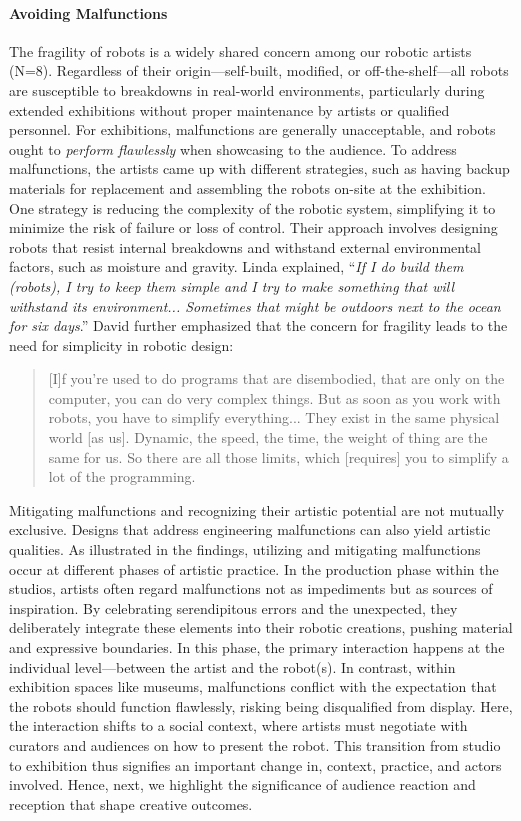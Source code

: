 \paragraph{Avoiding Malfunctions}
The fragility of robots is a widely shared concern among our robotic artists (N=8). Regardless of their origin---self-built, modified, or off-the-shelf---all robots are susceptible to breakdowns in real-world environments, particularly during extended exhibitions without proper maintenance by artists or qualified personnel. For exhibitions, malfunctions are generally unacceptable, and robots ought to \textit{perform flawlessly} when showcasing to the audience. To address malfunctions, the artists came up with different strategies, such as having backup materials for replacement and assembling the robots on-site at the exhibition. One strategy is reducing the complexity of the robotic system, simplifying it to minimize the risk of failure or loss of control. Their approach involves designing robots that resist internal breakdowns and withstand external environmental factors, such as moisture and gravity. Linda explained, ``\textit{If I do build them (robots), I try to keep them simple and I try to make something that will withstand its environment... Sometimes that might be outdoors next to the ocean for six days}.'' David further emphasized that the concern for fragility leads to the need for simplicity in robotic design:

\begin{quote}
    [I]f you're used to do programs that are disembodied, that are only on the computer, you can do very complex things. But as soon as you work with robots, you have to simplify everything... They exist in the same physical world [as us]. Dynamic, the speed, the time, the weight of thing are the same for us. So there are all those limits, which [requires] you to simplify a lot of the programming.
\end{quote}

Mitigating malfunctions and recognizing their artistic potential are not mutually exclusive. Designs that address engineering malfunctions can also yield artistic qualities. As illustrated in the findings, utilizing and mitigating malfunctions occur at different phases of artistic practice. In the production phase within the studios, artists often regard malfunctions not as impediments but as sources of inspiration. By celebrating serendipitous errors and the unexpected, they deliberately integrate these elements into their robotic creations, pushing material and expressive boundaries. In this phase, the primary interaction happens at the individual level---between the artist and the robot(s). In contrast, within exhibition spaces like museums, malfunctions conflict with the expectation that the robots should function flawlessly, risking being disqualified from display. Here, the interaction shifts to a social context, where artists must negotiate with curators and audiences on how to present the robot. This transition from studio to exhibition thus signifies an important change in, context, practice, and actors involved. Hence, next, we highlight the significance of audience reaction and reception that shape creative outcomes.

